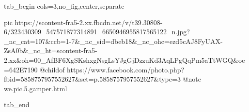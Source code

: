  
 
 
 
 


\ifcmt
  tab_begin cols=3,no_fig,center,separate

     pic https://scontent-fra5-2.xx.fbcdn.net/v/t39.30808-6/323430309_547571877314891_6650946955817565122_n.jpg?_nc_cat=107&ccb=1-7&_nc_sid=dbeb18&_nc_ohc=ezd5cAJ8FyUAX-ZsA0b&_nc_ht=scontent-fra5-2.xx&oh=00_AfBF6XgSKshxgNsgLsYJgGjDzzuKd3AqLPgQqPm5aTtWGQ&oe=642E7190
		 @childof https://www.facebook.com/photo.php?fbid=5858757957552627&set=p.5858757957552627&type=3
		 @note we.pic.5.gamper.html

  tab_end
\fi

